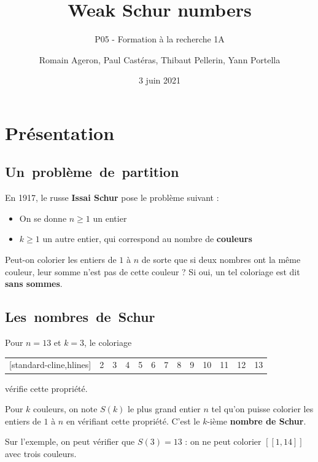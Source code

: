 \documentclass[graphics]{beamer}
\title[Weak Schur numbers]{Weak Schur numbers}
\subtitle{P05 - Formation à la recherche 1A}
\author[R. Ageron, P. Castéras, T. Pellerin, Y. Portella]{Romain Ageron, Paul Castéras, Thibaut Pellerin, Yann Portella}
\date{3 juin 2021}
\begin{document}
\begin{frame}
\titlepage
\end{frame}

\section{Présentation}
\subsection{Un~problème~de~partition}
\begin{frame}
	En 1917, le russe \textbf{Issai Schur} pose le problème suivant :
	\pause
	\begin{itemize}
		\item On se donne \(n \geq 1\) un entier
		\item \(k \geq 1\) un autre entier, qui correspond au nombre de \textbf{couleurs}
	\end{itemize}
	\pause
	\begin{tcolorbox}[colback=green!5,colframe=green!40!black,title=Question]
		Peut-on colorier les entiers de \(1\) à \(n\) de sorte que si deux nombres ont la même couleur,
		leur somme n'est pas de cette couleur ? Si oui, un tel coloriage est dit \textbf{sans sommes}.
	\end{tcolorbox}
\end{frame}

\subsection{Les~nombres~de~Schur}

\begin{frame}
	Pour \(n = 13\) et \(k = 3\), le coloriage \\
	\begin{center}
	\begin{NiceTabular}{|*{13}{c|}}[standard-cline,hlines]
		\CodeBefore
		 & 2 & 3 & 4 & 5 & 6 & 7 & 8 & 9 & 10 & 11 & 12 & 13\\
	\end{NiceTabular}
	\end{center}
	vérifie cette propriété.
	\pause
	\begin{tcolorbox}[colback=red!5,colframe=red!40!black,title=Définition]
		Pour \(k\) couleurs, on note \(S(k)\) le plus grand entier \(n\) tel qu'on puisse colorier les entiers de
		\(1\) à \(n\) en vérifiant cette propriété. C'est le \(k\)-ième \textbf{nombre de Schur}.
	\end{tcolorbox}
	\pause
	Sur l'exemple, on peut vérifier que \(S(3) = 13\) : on ne peut colorier \([\![1,14]\!]\) avec trois couleurs.
\end{frame}
\end{document}
